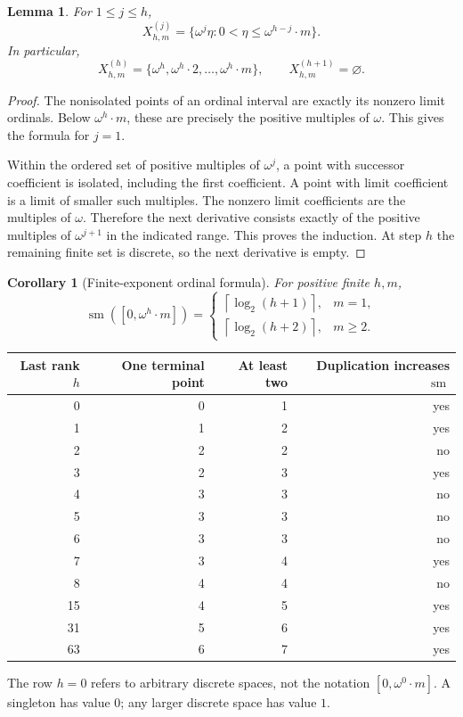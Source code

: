 \documentclass[11pt,letterpaper]{article}
\numberwithin{equation}{section}
\newtheorem{lemma}[lemma]{Lemma}
\newtheorem{corollary}[corollary]{Corollary}
\theoremstyle{definition}
\theoremstyle{remark}
\newcommand{\sm}{\operatorname{sm}}
\newcommand{\ceil}[1]{\left\lceil#1\right\rceil}
\begin{document}
\begin{lemma}\label{lem:ordinal-rank}
For $1\leq j\leq h$,
\begin{equation}\label{eq:ordinal-derivative}
 X_{h,m}^{(j)}=
 \{\omega^j\eta:0<\eta\leq\omega^{h-j}\cdot m\}.
\end{equation}
In particular,
\[
 X_{h,m}^{(h)}=\{\omega^h,\omega^h\cdot2,\ldots,\omega^h\cdot m\},
 \qquad X_{h,m}^{(h+1)}=\varnothing.
\]
\end{lemma}
\begin{proof}
The nonisolated points of an ordinal interval are exactly its nonzero limit
ordinals. Below $\omega^h\cdot m$, these are precisely the positive multiples
of $\omega$. This gives the formula for $j=1$.

Within the ordered set of positive multiples of $\omega^j$, a point with
successor coefficient is isolated, including the first coefficient. A point
with limit coefficient is a limit of smaller such multiples. The nonzero limit
coefficients are the multiples of $\omega$. Therefore the next derivative
consists exactly of the positive multiples of $\omega^{j+1}$ in the indicated
range. This proves the induction. At step $h$ the remaining finite set is
discrete, so the next derivative is empty.
\end{proof}

\begin{corollary}[Finite-exponent ordinal formula]\label{cor:ordinal}
For positive finite $h,m$,
\begin{equation}\label{eq:ordinal-sm}
 \sm([0,\omega^h\cdot m])=
 \begin{cases}
  \ceil{\log_2(h+1)},&m=1,\\
  \ceil{\log_2(h+2)},&m\geq2.
 \end{cases}
\end{equation}
\end{corollary}

\begin{center}
\begin{tabular}{@{}rrrr@{}}
\toprule
Last rank $h$ & One terminal point & At least two & Duplication increases $\sm$\\
\midrule
0 & 0 & 1 & yes\\
1 & 1 & 2 & yes\\
2 & 2 & 2 & no\\
3 & 2 & 3 & yes\\
4 & 3 & 3 & no\\
5 & 3 & 3 & no\\
6 & 3 & 3 & no\\
7 & 3 & 4 & yes\\
8 & 4 & 4 & no\\
15 & 4 & 5 & yes\\
31 & 5 & 6 & yes\\
63 & 6 & 7 & yes\\
\bottomrule
\end{tabular}
\end{center}
The row $h=0$ refers to arbitrary discrete spaces, not the notation
$[0,\omega^0\cdot m]$. A singleton has value $0$; any larger discrete space has
value $1$.
\end{document}
